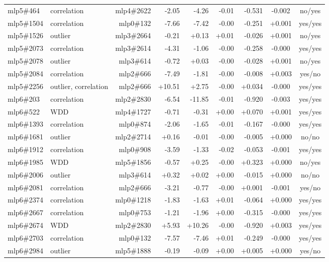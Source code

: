 \begin{center}
\begin{longtable}{llrrrrrcc}
mlp5\#464 & correlation & mlp4\#2622 & -2.05 & -4.26 & -0.01 & -0.531 & -0.002 & no/yes \\
mlp5\#1504 & correlation & mlp0\#132 & -7.66 & -7.42 & -0.00 & -0.251 & +0.001 & yes/yes \\
mlp5\#1526 & outlier & mlp3\#2664 & -0.21 & +0.13 & +0.01 & -0.026 & +0.001 & no/yes \\
mlp5\#2073 & correlation & mlp3\#2614 & -4.31 & -1.06 & -0.00 & -0.258 & -0.000 & yes/yes \\
mlp5\#2078 & outlier & mlp3\#614 & -0.72 & +0.03 & -0.00 & -0.028 & +0.001 & no/yes \\
mlp5\#2084 & correlation & mlp2\#666 & -7.49 & -1.81 & -0.00 & -0.008 & +0.003 & yes/no \\
mlp5\#2256 & outlier, correlation & mlp2\#666 & +10.51 & +2.75 & -0.00 & +0.034 & -0.000 & yes/yes \\
mlp6\#203 & correlation & mlp2\#2830 & -6.54 & -11.85 & -0.01 & -0.920 & -0.003 & yes/yes \\
mlp6\#522 & WDD & mlp4\#1727 & -0.71 & -0.31 & +0.00 & +0.070 & +0.001 & yes/yes \\
mlp6\#1393 & correlation & mlp0\#874 & -2.06 & -1.65 & -0.01 & -0.167 & -0.000 & yes/yes \\
mlp6\#1681 & outlier & mlp2\#2714 & +0.16 & -0.01 & -0.00 & -0.005 & +0.000 & no/no \\
mlp6\#1912 & correlation & mlp0\#908 & -3.59 & -1.33 & -0.02 & -0.053 & -0.001 & yes/yes \\
mlp6\#1985 & WDD & mlp5\#1856 & -0.57 & +0.25 & -0.00 & +0.323 & +0.000 & no/yes \\
mlp6\#2006 & outlier & mlp3\#614 & +0.32 & +0.02 & +0.00 & -0.015 & +0.000 & no/no \\
mlp6\#2081 & correlation & mlp2\#666 & -3.21 & -0.77 & -0.00 & +0.001 & -0.001 & yes/no \\
mlp6\#2374 & correlation & mlp0\#1218 & -1.83 & -1.63 & +0.01 & -0.064 & +0.000 & yes/yes \\
mlp6\#2667 & correlation & mlp0\#753 & -1.21 & -1.96 & +0.00 & -0.315 & -0.000 & yes/yes \\
mlp6\#2674 & WDD & mlp2\#2830 & +5.93 & +10.26 & -0.00 & -0.920 & +0.003 & yes/yes \\
mlp6\#2703 & correlation & mlp0\#132 & -7.57 & -7.46 & +0.01 & -0.249 & -0.000 & yes/yes \\
mlp6\#2984 & outlier & mlp5\#1888 & -0.19 & -0.09 & +0.00 & +0.005 & +0.000 & yes/no \\

\end{longtable}
\end{center}
